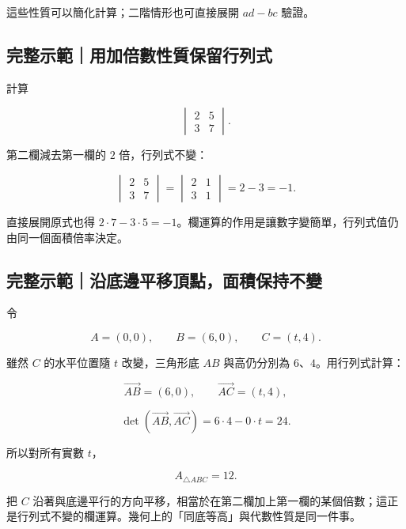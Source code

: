 \documentclass[11pt,a4paper]{article}
\begin{document}
這些性質可以簡化計算；二階情形也可直接展開 \(ad-bc\) 驗證。

\begin{HandoutWorkedExample}

\subsection{完整示範｜用加倍數性質保留行列式}\label{ux5b8cux6574ux793aux7bc4ux7528ux52a0ux500dux6578ux6027ux8ceaux4fddux7559ux884cux5217ux5f0f}

計算

\[
\begin{vmatrix}
2&5\\
3&7
\end{vmatrix}.
\]

第二欄減去第一欄的 \(2\) 倍，行列式不變：

\[
\begin{vmatrix}
2&5\\
3&7
\end{vmatrix}
=
\begin{vmatrix}
2&1\\
3&1
\end{vmatrix}
=2-3
=\boxed{-1}.
\]

直接展開原式也得 \(2\cdot7-3\cdot5=-1\)。欄運算的作用是讓數字變簡單，行列式值仍由同一個面積倍率決定。

\end{HandoutWorkedExample}

\begin{HandoutWorkedExample}

\subsection{完整示範｜沿底邊平移頂點，面積保持不變}\label{ux5b8cux6574ux793aux7bc4ux6cbfux5e95ux908aux5e73ux79fbux9802ux9edeux9762ux7a4dux4fddux6301ux4e0dux8b8a}

令

\[
A=(0,0),
\qquad
B=(6,0),
\qquad
C=(t,4).
\]

雖然 \(C\) 的水平位置隨 \(t\) 改變，三角形底 \(AB\) 與高仍分別為 \(6\)、\(4\)。用行列式計算：

\[
\overrightarrow{AB}=(6,0),
\qquad
\overrightarrow{AC}=(t,4),
\]

\[
\det(\overrightarrow{AB},\overrightarrow{AC})
=6\cdot4-0\cdot t=24.
\]

所以對所有實數 \(t\)，

\[
\boxed{A_{\triangle ABC}=12}.
\]

把 \(C\) 沿著與底邊平行的方向平移，相當於在第二欄加上第一欄的某個倍數；這正是行列式不變的欄運算。幾何上的「同底等高」與代數性質是同一件事。

\end{HandoutWorkedExample}
\end{document}
